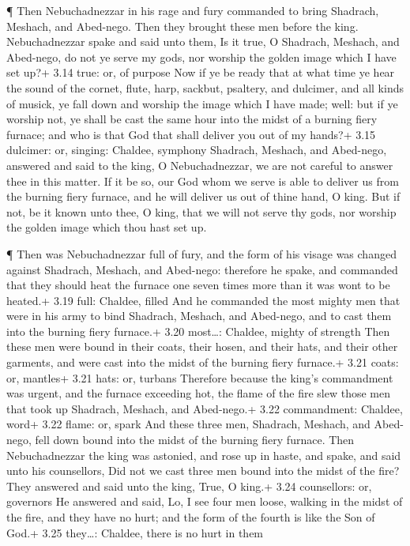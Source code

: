  ¶ Then Nebuchadnezzar in his rage and fury commanded to
bring Shadrach, Meshach, and Abed-nego. Then they brought these men
before the king.  Nebuchadnezzar spake and said unto them,
Is it true, O Shadrach, Meshach, and Abed-nego, do not ye serve my gods,
nor worship the golden image which I have set up?+ 3.14 true: or, of
purpose  Now if ye be ready that at what time ye hear the
sound of the cornet, flute, harp, sackbut, psaltery, and dulcimer, and
all kinds of musick, ye fall down and worship the image which I have
made; well: but if ye worship not, ye shall be cast the same hour into
the midst of a burning fiery furnace; and who is that God that shall
deliver you out of my hands?+ 3.15 dulcimer: or, singing: Chaldee,
symphony  Shadrach, Meshach, and Abed-nego, answered and
said to the king, O Nebuchadnezzar, we are not careful to answer thee in
this matter.  If it be so, our God whom we serve is able to
deliver us from the burning fiery furnace, and he will deliver us out of
thine hand, O king.  But if not, be it known unto thee, O
king, that we will not serve thy gods, nor worship the golden image
which thou hast set up.

 ¶ Then was Nebuchadnezzar full of fury, and the form of
his visage was changed against Shadrach, Meshach, and Abed-nego:
therefore he spake, and commanded that they should heat the furnace one
seven times more than it was wont to be heated.+ 3.19 full: Chaldee,
filled  And he commanded the most mighty men that were in
his army to bind Shadrach, Meshach, and Abed-nego, and to cast them into
the burning fiery furnace.+ 3.20 most\ldots: Chaldee, mighty of strength
 Then these men were bound in their coats, their hosen, and
their hats, and their other garments, and were cast into the midst of
the burning fiery furnace.+ 3.21 coats: or, mantles+ 3.21 hats: or,
turbans  Therefore because the king's commandment was
urgent, and the furnace exceeding hot, the flame of the fire slew those
men that took up Shadrach, Meshach, and Abed-nego.+ 3.22 commandment:
Chaldee, word+ 3.22 flame: or, spark  And these three men,
Shadrach, Meshach, and Abed-nego, fell down bound into the midst of the
burning fiery furnace.  Then Nebuchadnezzar the king was
astonied, and rose up in haste, and spake, and said unto his
counsellors, Did not we cast three men bound into the midst of the fire?
They answered and said unto the king, True, O king.+ 3.24 counsellors:
or, governors  He answered and said, Lo, I see four men
loose, walking in the midst of the fire, and they have no hurt; and the
form of the fourth is like the Son of God.+ 3.25 they\ldots: Chaldee,
there is no hurt in them


